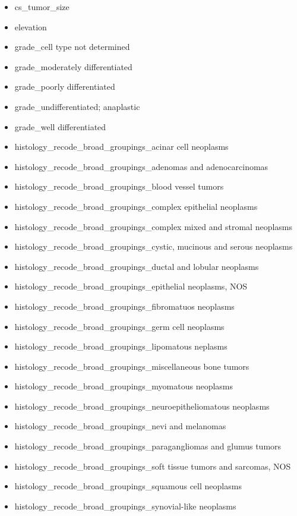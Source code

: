 \documentclass[10pt,letterpaper]{article}
\begin{document}
\begin{itemize}[noitemsep]
\item cs\_tumor\_size
\item elevation
\item grade\_cell type not determined
\item grade\_moderately differentiated
\item grade\_poorly differentiated
\item grade\_undifferentiated; anaplastic
\item grade\_well differentiated
\item histology\_recode\_broad\_groupings\_acinar cell neoplasms
\item histology\_recode\_broad\_groupings\_adenomas and adenocarcinomas
\item histology\_recode\_broad\_groupings\_blood vessel tumors
\item histology\_recode\_broad\_groupings\_complex epithelial neoplasms
\item histology\_recode\_broad\_groupings\_complex mixed and stromal neoplasms
\item histology\_recode\_broad\_groupings\_cystic, mucinous and serous neoplasms
\item histology\_recode\_broad\_groupings\_ductal and lobular neoplasms
\item histology\_recode\_broad\_groupings\_epithelial neoplasms, NOS
\item histology\_recode\_broad\_groupings\_fibromatuos neoplasms
\item histology\_recode\_broad\_groupings\_germ cell neoplasms
\item histology\_recode\_broad\_groupings\_lipomatous neplasms
\item histology\_recode\_broad\_groupings\_miscellaneous bone tumors
\item histology\_recode\_broad\_groupings\_myomatous neoplasms
\item histology\_recode\_broad\_groupings\_neuroepitheliomatous neoplasms
\item histology\_recode\_broad\_groupings\_nevi and melanomas
\item histology\_recode\_broad\_groupings\_paragangliomas and glumus tumors
\item histology\_recode\_broad\_groupings\_soft tissue tumors and sarcomas, NOS
\item histology\_recode\_broad\_groupings\_squamous cell neoplasms
\item histology\_recode\_broad\_groupings\_synovial-like neoplasms

\end{itemize}
\end{document}
